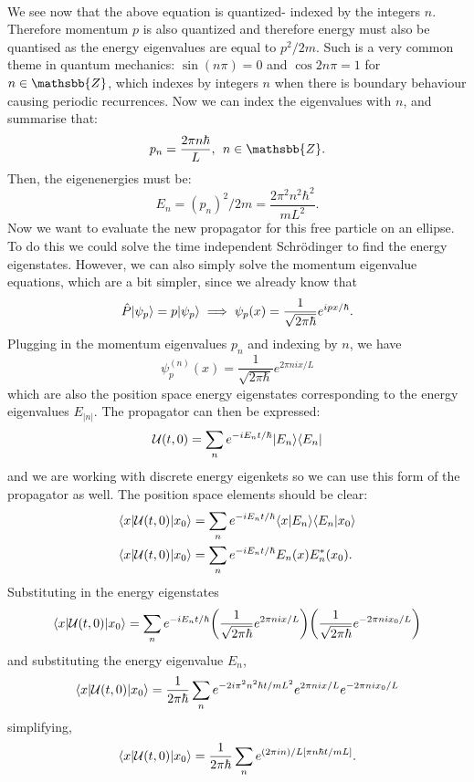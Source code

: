\\
We see now that the above equation is quantized- indexed by the integers $n$. Therefore momentum $p$ is also quantized and therefore energy must also be quantised as the energy eigenvalues are equal to $p^2/2m$. Such is a very common theme in quantum mechanics: $\sin(n\pi) = 0$ and $\cos{2n\pi}=1$ for $n\in\mathsbb{Z}$, which indexes by integers $n$ when there is boundary behaviour causing periodic recurrences. Now we can index the eigenvalues with $n$, and summarise that:
$$
\begin{aligned}
p_n= \frac{2\pi n\hbar}{L}, \:\: n\in\mathsbb{Z}.
\end{aligned}
$$
Then, the eigenenergies must be:
$$
E_{n}=(p_n)^2/2m=\frac{2\pi^2n^2\hbar^2}{mL^2}.
$$
Now we want to evaluate the new propagator for this free particle on an ellipse. To do this we could solve the time independent Schr\"{o}dinger to find the energy eigenstates. However, we can also simply solve the momentum eigenvalue equations, which are a bit simpler, since we already know that 
$$
\hat{P}|\psi_{p}\rangle=p|\psi_{p}\rangle\implies \psi_{p}(x)=\frac{1}{\sqrt{2\pi\hbar}}e^{ipx/\hbar}.
$$
Plugging in the momentum eigenvalues $p_{n}$ and indexing by $n$, we have
$$
\psi_{p}^{(n)}(x)=\frac{1}{\sqrt{2\pi\hbar}}e^{2\pi nix/L}
$$
which are also the position space energy eigenstates corresponding to the energy eigenvalues $E_{|n|}$. The propagator can then be expressed:
$$
\mathcal{U}(t,0)=\sum_{n}e^{-iE_{n}t/\hbar}|E_{n}\rangle\langle E_{n}|
$$
and we are working with discrete energy eigenkets so we can use this form of the propagator as well. The position space elements should be clear:
$$
\begin{aligned}
\langle x|{\mathcal{U}(t,0)}|x_{0}\rangle&=\sum_{n}e^{-iE_{n}t/\hbar}\langle x|E_{n}\rangle\langle E_{n}|x_{0}\rangle\\
\langle x|{\mathcal{U}(t,0)}|x_{0}\rangle&=\sum_{n}e^{-iE_{n}t/\hbar}E_{n}(x)E_{n}^{\ast}(x_{0}).
\end{aligned}
$$
Substituting in the energy eigenstates 
$$
\langle x|{\mathcal{U}(t,0)}|x_{0}\rangle=\sum_{n}e^{-iE_{n}t/\hbar}\biggl(\frac{1}{\sqrt{2\pi\hbar}}e^{2\pi nix/L}\biggr)\biggl(\frac{1}{\sqrt{2\pi\hbar}}e^{-2\pi nix_{0}/L}\biggr)
$$
and substituting the energy eigenvalue $E_{n}$,
$$
\langle x|{\mathcal{U}(t,0)}|x_{0}\rangle=\frac{1}{2\pi \hbar}\sum_{n}e^{-2i\pi^{2}n^{2}\hbar t/mL^{2}}e^{2\pi nix/L}e^{-2\pi nix_{0}/L}
$$
simplifying,
$$
\langle x|{\mathcal{U}(t,0)}|x_{0}\rangle=\frac{1}{2\pi \hbar}\sum_{n}e^{(2\pi i n)/L[\pi n\hbar t/mL ]}.
$$
\\\\
